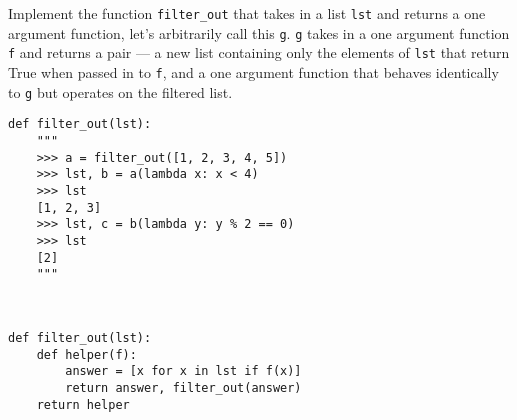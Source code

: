 \begin{blocksection}
\question Implement the function \lstinline$filter_out$ that takes in a list \lstinline$lst$ and returns a one argument function, let’s arbitrarily call this \lstinline$g$. \lstinline$g$ takes in a one argument function \lstinline$f$  and returns a pair — a new list containing only the elements of \lstinline$lst$ that return True when passed in to \lstinline$f$, and a one argument function that behaves identically to \lstinline$g$ but operates on the filtered list.

\begin{lstlisting}
def filter_out(lst):
    """
    >>> a = filter_out([1, 2, 3, 4, 5])
    >>> lst, b = a(lambda x: x < 4)
    >>> lst
    [1, 2, 3]
    >>> lst, c = b(lambda y: y % 2 == 0)
    >>> lst
    [2]
    """

    
\end{lstlisting}

\begin{solution}[1.5in]
\begin{lstlisting}
def filter_out(lst):
    def helper(f):
        answer = [x for x in lst if f(x)]
        return answer, filter_out(answer)
    return helper
\end{lstlisting}
\end{solution}
\end{blocksection}
